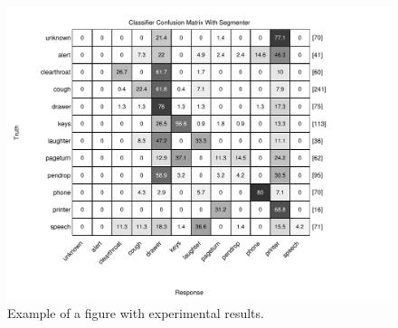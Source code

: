 \begin{figure}[h]
  \centering
  \centerline{\includegraphics[width=\columnwidth]{confmatrix2-eps-converted-to.pdf}}
  \caption{Example of a figure with experimental results.}
  \label{fig:confmat_seg}
\end{figure}
